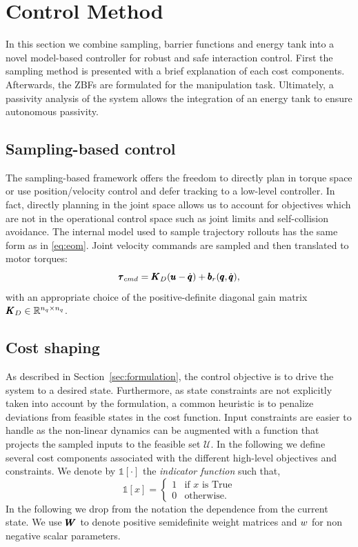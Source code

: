 \section{Control Method} \label{sec:control_method}

In this section we combine sampling, barrier functions and energy tank into a novel model-based controller for robust and safe interaction control. First the sampling method is presented with a brief explanation of each cost components. Afterwards, the ZBFs are formulated for the manipulation task. Ultimately, a passivity analysis of the system allows the integration of an energy tank to ensure autonomous passivity. 

\subsection{Sampling-based control}
The sampling-based framework offers the freedom to directly plan in torque space or use position/velocity control and defer tracking to a low-level controller. In fact, directly planning in the joint space allows us to account for objectives which are not in the operational control space such as joint limits and self-collision avoidance. The internal model used to sample trajectory rollouts has the same form as in \eqn \ref{eq:eom}. Joint velocity commands are sampled and then translated to motor torques:
\begin{equation}
    \pmb{\tau}_{cmd} = \pmb{K}_{D} (\pmb{u} - \dot{\pmb{q}}) + \pmb{b}_{r}(\pmb{q}, \dot{\pmb{q}}),
\end{equation}
with an appropriate choice of the positive-definite diagonal gain matrix $\pmb{K}_{D} \in \mathbb{R}^{n_q\times n_q}$. 

\subsection{Cost shaping}
As described in Section~\ref{sec:formulation}, the control objective is to drive the system to a desired state. Furthermore, as state constraints are not explicitly taken into account by the formulation, a common heuristic is to penalize deviations from feasible states in the cost function. Input constraints are easier to handle as the non-linear dynamics can be augmented with a function that projects the sampled inputs to the feasible set $\mathcal{U}$. In the following we define several cost components associated with the different high-level objectives and constraints.
We denote by $\mathds{1}[\cdot]$ the \textit{indicator function} such that,
\begin{equation}
    \mathds{1}[x] = 
    \begin{cases}
    1 & \text{if } x \text{ is True} \\
    0 & \text{otherwise}.
    \end{cases}
\end{equation}
In the following we drop from the notation the dependence from the current state. We use $\pmb{W}_{}$ to denote positive semidefinite weight matrices and $w_{}$ for non negative scalar parameters. 

